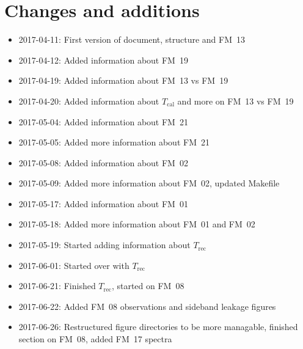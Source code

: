 \chapter{Changes and additions}
\label{ch:changes}

\begin{itemize}
    \item 2017-04-11: First version of document, structure and FM~13
    \item 2017-04-12: Added information about FM~19
    \item 2017-04-19: Added information about FM~13 vs FM~19
    \item 2017-04-20: Added information about $T_\mathrm{cal}$
                      and more on FM~13 vs FM~19
    \item 2017-05-04: Added information about FM~21
    \item 2017-05-05: Added more information about FM~21
    \item 2017-05-08: Added information about FM~02
    \item 2017-05-09: Added more information about FM~02, updated Makefile
    \item 2017-05-17: Added information about FM~01
    \item 2017-05-18: Added more information about FM~01 and FM~02
    \item 2017-05-19: Started adding information about $T_\mathrm{rec}$
    \item 2017-06-01: Started over with $T_\mathrm{rec}$
    \item 2017-06-21: Finished $T_\mathrm{rec}$, started on FM~08
    \item 2017-06-22: Added FM~08 observations and sideband leakage figures
    \item 2017-06-26: Restructured figure directories to be more managable,
                      finished section on FM~08, added FM~17 spectra
\end{itemize}
